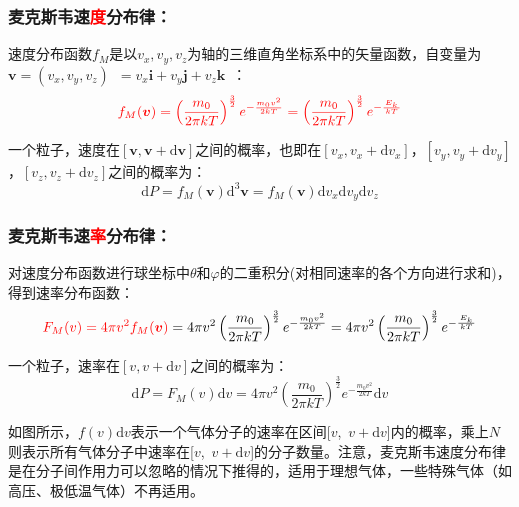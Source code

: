 \documentclass[zihao=-4,UTF8]{report}
\begin{document}
\subsubsection{麦克斯韦速\textcolor{red}{度}分布律：}
速度分布函数$f_M$是以$v_x,v_y,v_z$为轴的三维直角坐标系中的矢量函数，自变量为$\boldsymbol{v} = (v_x,v_y,v_z)$\ $ = v_x\boldsymbol{i} +v_y\boldsymbol{j}+v_z\boldsymbol{k}$\ ：
\begin{equation}\textcolor{red}{f_M(\boldsymbol{v}) = \left(\frac{m_0}{2\pi kT}\right)^{\frac{3}{2}}e^{-\frac{m_0v^2}{2kT}} = \left(\frac{m_0}{2\pi kT}\right)^{\frac{3}{2}}e^{-\frac{E_k}{\,kT\,}}}
\end{equation}\par
一个粒子，速度在$[\boldsymbol{v} , \boldsymbol{v} + \mathrm{d}\boldsymbol{v}]$之间的概率，也即在$[v_x ,v_x +\mathrm{d}v_x]$，$[v_y ,v_y +\mathrm{d}v_y]$，$[v_z ,v_z +\mathrm{d}v_z]$之间的概率为：
\begin{equation}
    \mathrm{d} P =f_M(\boldsymbol{v})\mathrm{d}^3\boldsymbol{v}=f_M(\boldsymbol{v})\mathrm{d}v_x\mathrm{d}v_y\mathrm{d}v_z
\end{equation}

\subsubsection{麦克斯韦速\textcolor{red}{率}分布律：}
对速度分布函数进行球坐标中$\theta $和$\varphi$的二重积分(对相同速率的各个方向进行求和)，得到速率分布函数：
\begin{equation}\textcolor{red}{ F_M(v) = 4\pi v^2 f_M(\boldsymbol{v}) }
   = 4\pi v^2\left(\frac{m_0}{2\pi kT}\right)^{\frac{3}{2}}e^{-\frac{m_0v^2}{2kT}} = 4\pi v^2\left(\frac{m_0}{2\pi kT}\right)^{\frac{3}{2}}e^{-\frac{E_k}{\,kT\,}}
\end{equation}\par

一个粒子，速率在$[v, v+\mathrm{d}v]$之间的概率为：
\begin{equation}
    \mathrm{d} P = F_M(v)\mathrm{d}v = 4\pi v^2\left(\frac{m_0}{2\pi kT}\right)^{\frac{3}{2}}e^{-\frac{m_0v^2}{2kT}}\mathrm{d}v
\end{equation}
\par
{\color{gray}\small  如图所示，$f(v)\mathrm{d}v$表示一个气体分子的速率在区间[$v$,\ $v+\mathrm{d}v$]内的概率，乘上$N$则表示所有气体分子中速率在[$v$,\ $v+\mathrm{d}v$]的分子数量。注意，麦克斯韦速度分布律是在分子间作用力可以忽略的情况下推得的，适用于理想气体，一些特殊气体（如高压、极低温气体）不再适用。}
\end{document}

